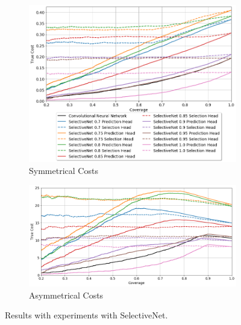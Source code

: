 \begin{figure}[h]
	\centering
	\begin{subfigure}{\textwidth}
		\centering
		\includegraphics[width=\linewidth]{images/multi-class-selective-sym.png}
		\caption{Symmetrical Costs}	
	\end{subfigure}
	\begin{subfigure}{\textwidth}
		\centering
		\includegraphics[width=\linewidth]{images/multi-class-selective-asym.png}
		\caption{Asymmetrical Costs}
	\end{subfigure}
	\caption{Results with experiments with SelectiveNet.}
	\label{fig:multi-class-selective}
\end{figure}

